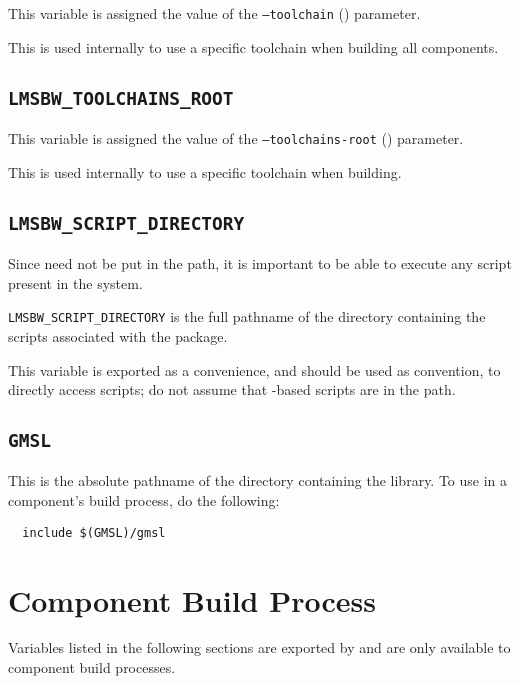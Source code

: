This variable is assigned the value of the \texttt{--toolchain}
() parameter.

This is used internally to use a specific toolchain when building all
components.

\subsection{\texttt{LMSBW\_TOOLCHAINS\_ROOT}}
\label{envvar:lmsbw-toolchains-root}

This variable is assigned the value of the \texttt{--toolchains-root}
() parameter.

This is used internally to use a specific toolchain when building.

\subsection{\texttt{LMSBW\_SCRIPT\_DIRECTORY}}
\label{envvars:lmsbw-script-directory}
Since \lmsbw need not be put in the path, it is important to be able
to execute any script present in the \lmsbw system.

\texttt{LMSBW\_SCRIPT\_DIRECTORY} is the full pathname of the
directory containing the scripts associated with the \lmsbw package.

This variable is exported as a convenience, and should be used as
convention, to directly access scripts; do not assume that
\lmsbw-based scripts are in the path.

\subsection{\texttt{GMSL}}

This is the absolute pathname of the directory containing the \gmsl
library.  To use \gmsl in a component's build process, do the
following:

\begin{verbatim}
  include $(GMSL)/gmsl
\end{verbatim}

\section{Component Build Process}

Variables listed in the following sections are exported by \lmsbw and
are only available to component build processes.

\subsection{\destdir}


